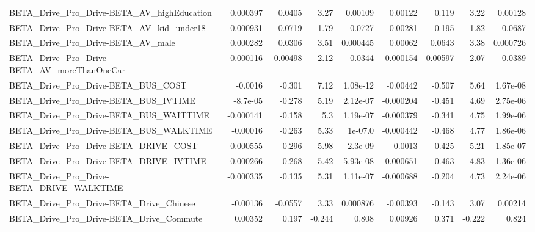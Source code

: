 \begin{tabular}{lrrrrrrrr}
BETA\_Drive\_Pro\_Drive-BETA\_AV\_highEducation         &    0.000397 &       0.0405 &     3.27 &  0.00109 &    0.00122 &       0.119 &         3.22 &       0.00128 \\
BETA\_Drive\_Pro\_Drive-BETA\_AV\_kid\_under18           &    0.000931 &       0.0719 &     1.79 &   0.0727 &    0.00281 &       0.195 &         1.82 &        0.0687 \\
BETA\_Drive\_Pro\_Drive-BETA\_AV\_male                  &    0.000282 &       0.0306 &     3.51 & 0.000445 &    0.00062 &      0.0643 &         3.38 &      0.000726 \\
BETA\_Drive\_Pro\_Drive-BETA\_AV\_moreThanOneCar        &   -0.000116 &     -0.00498 &     2.12 &   0.0344 &   0.000154 &     0.00597 &         2.07 &        0.0389 \\
BETA\_Drive\_Pro\_Drive-BETA\_BUS\_COST                 &     -0.0016 &       -0.301 &     7.12 & 1.08e-12 &   -0.00442 &      -0.507 &         5.64 &      1.67e-08 \\
BETA\_Drive\_Pro\_Drive-BETA\_BUS\_IVTIME               &    -8.7e-05 &       -0.278 &     5.19 & 2.12e-07 &  -0.000204 &      -0.451 &         4.69 &      2.75e-06 \\
BETA\_Drive\_Pro\_Drive-BETA\_BUS\_WAITTIME             &   -0.000141 &       -0.158 &      5.3 & 1.19e-07 &  -0.000379 &      -0.341 &         4.75 &      1.99e-06 \\
BETA\_Drive\_Pro\_Drive-BETA\_BUS\_WALKTIME             &    -0.00016 &       -0.263 &     5.33 &  1e-07.0 &  -0.000442 &      -0.468 &         4.77 &      1.86e-06 \\
BETA\_Drive\_Pro\_Drive-BETA\_DRIVE\_COST               &   -0.000555 &       -0.296 &     5.98 &  2.3e-09 &    -0.0013 &      -0.425 &         5.21 &      1.85e-07 \\
BETA\_Drive\_Pro\_Drive-BETA\_DRIVE\_IVTIME             &   -0.000266 &       -0.268 &     5.42 & 5.93e-08 &  -0.000651 &      -0.463 &         4.83 &      1.36e-06 \\
BETA\_Drive\_Pro\_Drive-BETA\_DRIVE\_WALKTIME           &   -0.000335 &       -0.135 &     5.31 & 1.11e-07 &  -0.000688 &      -0.204 &         4.73 &      2.24e-06 \\
BETA\_Drive\_Pro\_Drive-BETA\_Drive\_Chinese            &    -0.00136 &      -0.0557 &     3.33 & 0.000876 &   -0.00393 &      -0.143 &         3.07 &       0.00214 \\
BETA\_Drive\_Pro\_Drive-BETA\_Drive\_Commute            &     0.00352 &        0.197 &   -0.244 &    0.808 &    0.00926 &       0.371 &       -0.222 &         0.824 \\

\end{tabular}
